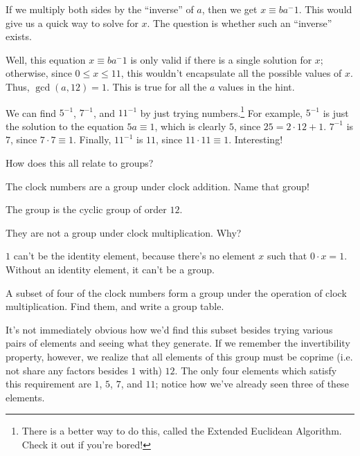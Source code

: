 \documentclass[../gatm_answers.tex]{subfiles}
\begin{document}
If we multiply both sides by the ``inverse'' of $a$, then we get $x\equiv ba^-1$. This would give us a quick way to solve for $x$. The question is whether such an ``inverse'' exists.

Well, this equation $x\equiv ba^-1$ is only valid if there is a single solution for $x$; otherwise, since $0\leq x \leq 11$, this wouldn't encapsulate all the possible values of $x$. Thus, $\gcd(a,12)=1$. This is true for all the $a$ values in the hint.

We can find $5^{-1}$, $7^{-1}$, and $11^{-1}$ by just trying numbers.\footnote{There is a better way to do this, called the Extended Euclidean Algorithm. Check it out if you're bored!} For example, $5^{-1}$ is just the solution to the equation $5a\equiv 1$, which is clearly $5$, since $25=2\cdot 12 + 1$. $7^{-1}$ is $7$, since $7\cdot 7 \equiv 1$. Finally, $11^{-1}$ is $11$, since $11\cdot 11\equiv 1$. Interesting!

\begin{outer_problem}
\item How does this all relate to groups?
\end{outer_problem}

\begin{inner_problem}[start=1]
\item The clock numbers are a group under clock addition. Name that group!
\end{inner_problem}

The group is the cyclic group of order $12$.

\begin{inner_problem}
\item They are not a group under clock multiplication. Why?
\end{inner_problem}

$1$ can't be the identity element, because there's no element $x$ such that $0\cdot x = 1$. Without an identity element, it can't be a group.

\begin{inner_problem}
\item A subset of four of the clock numbers form a group under the operation of clock multiplication. Find them, and write a group table.
\end{inner_problem}

It's not immediately obvious how we'd find this subset besides trying various pairs of elements and seeing what they generate. If we remember the invertibility property, however, we realize that all elements of this group must be coprime (i.e. not share any factors besides $1$ with) $12$. The only four elements which satisfy this requirement are $1$, $5$, $7$, and $11$; notice how we've already seen three of these elements.
\end{document}
